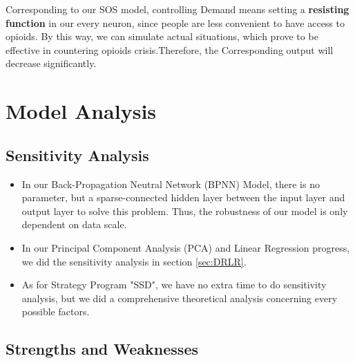 \documentclass{mcmthesis}
\begin{document}
Corresponding to our SOS model, controlling Demand means setting a \textbf{resisting function} in our every neuron, since people are less convenient to have access to opioids. By this way, we can simulate actual situations, which prove to be effective in countering opioids crisis.Therefore, the Corresponding output will decrease significantly.
\section{Model Analysis}\label{Sec-Analysis}

\subsection{Sensitivity Analysis}
\begin{itemize}
    \item In our Back-Propagation Neutral Network (BPNN) Model, there is no parameter, but a sparse-connected hidden layer between the input layer and output layer to solve this problem. Thus, the robustness of our model is only dependent on data scale.
    \item In our Principal Component Analysis (PCA) and Linear Regression progress, we did the sensitivity analysis in section \ref{sec:DRLR}.
    \item As for Strategy Program "SSD", we have no extra time to do sensitivity analysis, but we did a comprehensive theoretical analysis concerning every possible factors.
\end{itemize}

\subsection{Strengths and Weaknesses}
\end{document}
